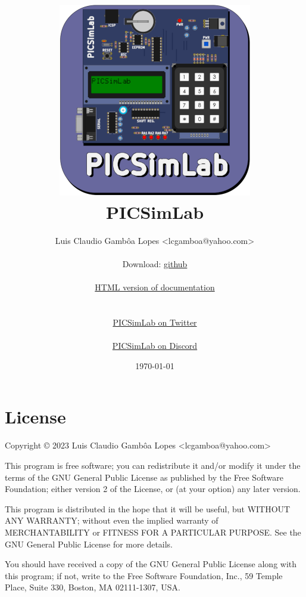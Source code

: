 \documentclass[oneside]{book}
\title{ ~~\\ ~~\\ ~~\\ \includegraphics[scale=1.0]{img/logo.png} \\ PICSimLab \PNversion}
\author{Luis Claudio Gambôa Lopes  <lcgamboa@yahoo.com>\\
\\
{\centering Download: \href{https://github.com/lcgamboa/picsimlab}{github}}
\\
\ifpdf
\\
{\centering \href{https://lcgamboa.github.io/picsimlab\_docs/\PNversion/}{HTML version of documentation}} 
\else
\\
{\centering \hrefb{picsimlab.pdf}{PDF version of documentation}} 
\fi
\\
\\
{\centering \href{https://twitter.com/PICSimLab}{PICSimLab on Twitter}}
\\
\\
{\centering \href{https://discord.gg/fMT8szFYq7}{PICSimLab on Discord}}
}
\date{\today}
\begin{document}
\def\hrefb#1#2{\href{#1}{#2}}
\def\hrefr#1#2{\href{run:#1}{#2}}


\hypersetup{pageanchor=false}
\maketitle
\hypersetup{pageanchor=true}

\ifdefined\HCode\else
\tableofcontents
\fi





%







\chapter{License}

Copyright © 2023 Luis Claudio Gambôa Lopes <lcgamboa@yahoo.com>

This program is free software; you can redistribute it and/or modify
it under the terms of the GNU General Public License as published by
the Free Software Foundation; either version 2 of the License, or
(at your option) any later version.

This program is distributed in the hope that it will be useful,
but WITHOUT ANY WARRANTY; without even the implied warranty of
MERCHANTABILITY or FITNESS FOR A PARTICULAR PURPOSE. See the
GNU General Public License for more details.

You should have received a copy of the GNU General Public License
along with this program; if not, write to the Free Software
Foundation, Inc., 59 Temple Place, Suite 330,
Boston, MA 02111-1307, USA.

\appendix



\end{document}
